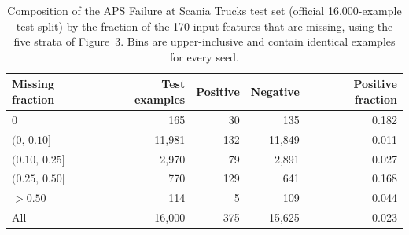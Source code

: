 \begin{table}[H]
\centering
\small
\caption{Composition of the APS Failure at Scania Trucks test set (official 16{,}000-example test split) by the fraction of the 170 input features that are missing, using the five strata of Figure~3. Bins are upper-inclusive and contain identical examples for every seed.}
\label{tab:aps_strata_counts}
\begin{tabular}{@{}lrrrr@{}}
\toprule
Missing fraction & Test examples & Positive & Negative & Positive fraction \\
\midrule
$0$ & 165 & 30 & 135 & 0.182 \\
$(0,\,0.10]$ & 11{,}981 & 132 & 11{,}849 & 0.011 \\
$(0.10,\,0.25]$ & 2{,}970 & 79 & 2{,}891 & 0.027 \\
$(0.25,\,0.50]$ & 770 & 129 & 641 & 0.168 \\
$>0.50$ & 114 & 5 & 109 & 0.044 \\
\midrule
All & 16{,}000 & 375 & 15{,}625 & 0.023 \\
\bottomrule
\end{tabular}
\end{table}
